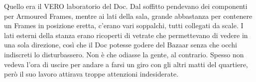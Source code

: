     Quello era il VERO laboratorio del Doc. Dal soffitto pendevano dei componenti per Armoured Frames, mentre ai lati
    della sala, grande abbastanza per contenere un Frames in posizione eretta, c'erano vari soppalchi, tutti collegati
    da scale. I lati esterni della stanza erano ricoperti di vetrate che permettevano di vedere in una sola direzione,
    così che il Doc potesse godere del Bazaar senza che occhi indiscreti lo disturbassero. Non è che odiasse la gente,
    al contrario. Spesso non vedeva l'ora di uscire per andare a farsi un giro con gli altri matti del quartiere, però
    il suo lavoro attirava troppe attenzioni indesiderate.
